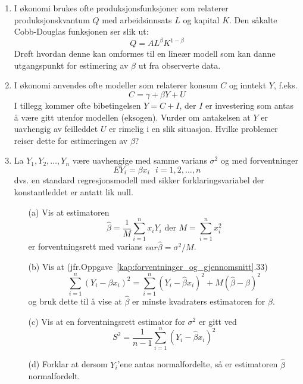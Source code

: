 \begin{enumerate}
\item
I økonomi brukes ofte produksjonsfunksjoner som relaterer 
produksjons\-kvantum $Q$ med arbeidsinnsats $L$ og kapital $K$.  Den 
såkalte Cobb-Douglas funksjonen ser slik ut:
   \[ Q=AL^{\beta}K^{1-\beta} \]
Drøft hvordan denne kan omformes til en lineær modell som kan danne
utgangspunkt for estimering av ${\beta}$ ut fra observerte data.

\item
I økonomi anvendes ofte modeller som relaterer konsum $C$ og inntekt $Y$,
f.eks.
\[  C = \gamma + {\beta}Y + U\]
I tillegg kommer ofte bibetingelsen $Y = C + I$, der $I$ er investering som
antas å være gitt utenfor modellen (eksogen).  Vurder om antakelsen
at $Y$ er uavhengig av feilleddet $U$ er rimelig i en slik situasjon.  
Hvilke problemer reiser dette for estimeringen av $\beta$?

\item
La $Y_1, Y_2, \ldots, Y_n$ være uavhengige med samme varians ${\sigma}^2$
og med forventninger
  \[  EY_i=\beta x_i \mbox{\ \ \ } i=1,2, \ldots , n \] 
dvs. en standard regresjonsmodell med sikker forklaringsvariabel der
konstantleddet er antatt lik null.

\begin{itemize}
\item[(a)] Vis at estimatoren
 \[ \hat{\beta}=\frac{1}{M}\sum_{i=1}^nx_iY_i \mbox{\ \ \ der \ \ \ }
                             M=\sum_{i=1}^nx_i^2 \]
 er forventningsrett med varians  $var\hat{\beta}={\sigma}^2/M$.
\item[(b)] Vis at (jfr.Oppgave~\ref*{kap:forventninger_og_gjennomsnitt}.33)
 \[ \sum_{i=1}^n{(Y_i-\beta x_i)}^2=\sum_{i=1}^n{(Y_i-\hat{\beta}x_i)}^2+
                                        M{(\hat{\beta}-\beta)}^2 \]
og bruk dette til å vise at $\hat{\beta}$ er minste kvadraters 
estimatoren for $\beta$.
\item[(c)] Vis at en forventningsrett estimator for ${\sigma}^2$ er gitt
ved
\[  S^2=\frac{1}{n-1}\sum_{i=1}^n{(Y_i-\hat{\beta}x_i)}^2 \]
\item[(d)] Forklar at dersom $Y_i$'ene antas normalfordelte, så er
estimatoren $\hat{\beta}$ normalfordelt.
\end{itemize}


\end{enumerate}
